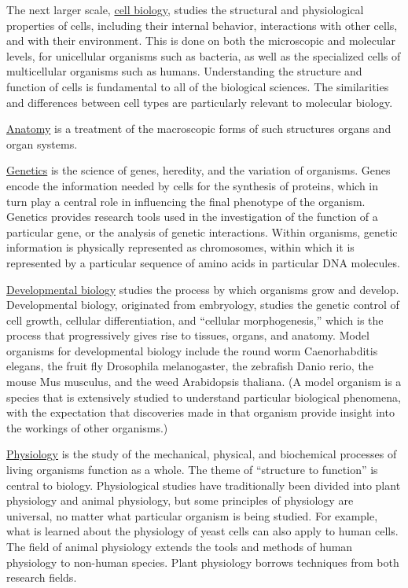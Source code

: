 The next larger scale, \href{https://en.wikipedia.org/wiki/Cell_biology}{cell biology}, studies the structural and physiological properties of cells, including their internal behavior, interactions with other cells, and with their environment. This is done on both the microscopic and molecular levels, for unicellular organisms such as bacteria, as well as the specialized cells of multicellular organisms such as humans. Understanding the structure and function of cells is fundamental to all of the biological sciences. The similarities and differences between cell types are particularly relevant to molecular biology.

\href{https://en.wikipedia.org/wiki/Anatomy}{Anatomy} is a treatment of the macroscopic forms of such structures organs and organ systems.

\href{https://en.wikipedia.org/wiki/Genetics}{Genetics} is the science of genes, heredity, and the variation of organisms. Genes encode the information needed by cells for the synthesis of proteins, which in turn play a central role in influencing the final phenotype of the organism. Genetics provides research tools used in the investigation of the function of a particular gene, or the analysis of genetic interactions. Within organisms, genetic information is physically represented as chromosomes, within which it is represented by a particular sequence of amino acids in particular DNA molecules.

\href{https://en.wikipedia.org/wiki/Developmental_biology}{Developmental biology} studies the process by which organisms grow and develop. Developmental biology, originated from embryology, studies the genetic control of cell growth, cellular differentiation, and ``cellular morphogenesis,'' which is the process that progressively gives rise to tissues, organs, and anatomy. Model organisms for developmental biology include the round worm Caenorhabditis elegans, the fruit fly Drosophila melanogaster, the zebrafish Danio rerio, the mouse Mus musculus, and the weed Arabidopsis thaliana. (A model organism is a species that is extensively studied to understand particular biological phenomena, with the expectation that discoveries made in that organism provide insight into the workings of other organisms.)

\href{https://en.wikipedia.org/wiki/Physiology}{Physiology} is the study of the mechanical, physical, and biochemical processes of living organisms function as a whole. The theme of ``structure to function'' is central to biology. Physiological studies have traditionally been divided into plant physiology and animal physiology, but some principles of physiology are universal, no matter what particular organism is being studied. For example, what is learned about the physiology of yeast cells can also apply to human cells. The field of animal physiology extends the tools and methods of human physiology to non-human species. Plant physiology borrows techniques from both research fields.


